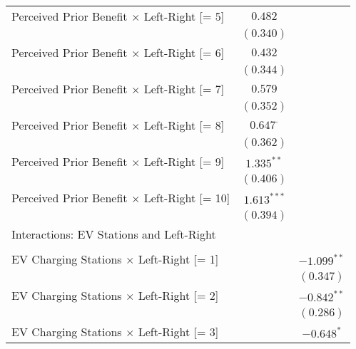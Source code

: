 \begin{center}
\begin{tiny}
\begin{longtable}{l@{} c@{} c@{}}
\quad Perceived Prior Benefit $\times$ Left-Right [= 5]  & $0.482$          &                  \\
                                                         & $(0.340)$        &                  \\
\quad Perceived Prior Benefit $\times$ Left-Right [= 6]  & $0.432$          &                  \\
                                                         & $(0.344)$        &                  \\
\quad Perceived Prior Benefit $\times$ Left-Right [= 7]  & $0.579$          &                  \\
                                                         & $(0.352)$        &                  \\
\quad Perceived Prior Benefit $\times$ Left-Right [= 8]  & $0.647^{\cdot}$  &                  \\
                                                         & $(0.362)$        &                  \\
\quad Perceived Prior Benefit $\times$ Left-Right [= 9]  & $1.335^{**}$     &                  \\
                                                         & $(0.406)$        &                  \\
\quad Perceived Prior Benefit $\times$ Left-Right [= 10] & $1.613^{***}$    &                  \\
                                                         & $(0.394)$        &                  \\
Interactions: EV Stations and Left-Right                 &                  &                  \\
                                                         &                  &                  \\
\quad EV Charging Stations $\times$ Left-Right [= 1]     &                  & $-1.099^{**}$    \\
                                                         &                  & $(0.347)$        \\
\quad EV Charging Stations $\times$ Left-Right [= 2]     &                  & $-0.842^{**}$    \\
                                                         &                  & $(0.286)$        \\
\quad EV Charging Stations $\times$ Left-Right [= 3]     &                  & $-0.648^{*}$     \\

\end{longtable}
\end{tiny}
\end{center}
